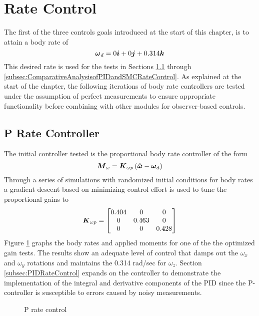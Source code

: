 \section{Rate Control}
\label{sec:RateControl}

The first of the three controls goals introduced at the start of this chapter, is to attain a body rate of
\begin{equation}
  \boldsymbol{\omega}_d = 0 \boldsymbol{i} + 0 \boldsymbol{j} + 0.314 \boldsymbol{k}
\end{equation}
This desired rate is used for the tests in Sections \ref{subsec:PRateControl} through \ref{subsec:ComparativeAnalysisofPIDandSMCRateControl}.  As explained at the start of the chapter, the following iterations of body rate controllers are tested under the assumption of perfect measurements to ensure appropriate functionality before combining with other modules for observer-based controls.
\subsection{P Rate Controller}
\label{subsec:PRateControl}
The initial controller tested is the proportional body rate controller of the form
\begin{equation}
  \boldsymbol{M}_{\omega} = \boldsymbol{K}_{\omega p} \left( \boldsymbol{\hat{\omega}} - \boldsymbol{\omega}_d \right)
  \label{eqn:PRateControl}
\end{equation}
Through a series of simulations with randomized initial conditions for body rates a gradient descent based on minimizing control effort is used to tune the proportional gains to
\begin{equation}
  \boldsymbol{K}_{\omega p} = \begin{bmatrix} 0.404 & 0 & 0 \\ 0 & 0.463 & 0 \\ 0 & 0 & 0.428 \end{bmatrix}
\end{equation}
Figure \ref{fig:PRateControl} graphs the body rates and applied moments for one of the the optimized gain tests.  The results show an adequate level of control that damps out the $\omega_x$ and $\omega_y$ rotations and maintains the 0.314 rad/sec for $\omega_z$.  Section \ref{subsec:PIDRateControl} expands on the controller to demonstrate the implementation of the integral and derivative components of the PID since the P-controller is susceptible to errors caused by noisy measurements.
\begin{figure}[H]
  \centerline{}
  \caption{P rate control}
  \label{fig:PRateControl}
\end{figure}

